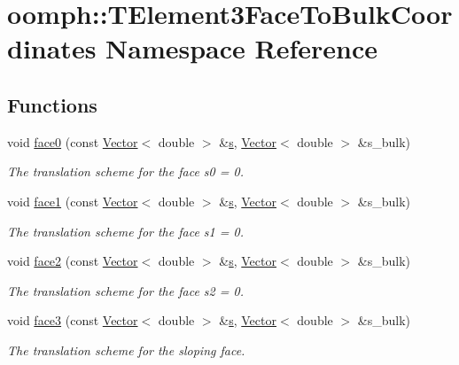 \hypertarget{namespaceoomph_1_1TElement3FaceToBulkCoordinates}{}\section{oomph\+:\+:T\+Element3\+Face\+To\+Bulk\+Coordinates Namespace Reference}
\label{namespaceoomph_1_1TElement3FaceToBulkCoordinates}
\subsection*{Functions}
\begin{DoxyCompactItemize}
\item 
void \hyperlink{namespaceoomph_1_1TElement3FaceToBulkCoordinates_a5219ed97ede607f460050f82386913d1}{face0} (const \hyperlink{classoomph_1_1Vector}{Vector}$<$ double $>$ \&\hyperlink{cfortran_8h_ab7123126e4885ef647dd9c6e3807a21c}{s}, \hyperlink{classoomph_1_1Vector}{Vector}$<$ double $>$ \&s\+\_\+bulk)
\begin{DoxyCompactList}\small\item\em The translation scheme for the face s0 = 0. \end{DoxyCompactList}\item 
void \hyperlink{namespaceoomph_1_1TElement3FaceToBulkCoordinates_a34958665c3b0f20c4ec8358ed867a6ce}{face1} (const \hyperlink{classoomph_1_1Vector}{Vector}$<$ double $>$ \&\hyperlink{cfortran_8h_ab7123126e4885ef647dd9c6e3807a21c}{s}, \hyperlink{classoomph_1_1Vector}{Vector}$<$ double $>$ \&s\+\_\+bulk)
\begin{DoxyCompactList}\small\item\em The translation scheme for the face s1 = 0. \end{DoxyCompactList}\item 
void \hyperlink{namespaceoomph_1_1TElement3FaceToBulkCoordinates_a453bcd1929cf8dca1e2601f464eda6d1}{face2} (const \hyperlink{classoomph_1_1Vector}{Vector}$<$ double $>$ \&\hyperlink{cfortran_8h_ab7123126e4885ef647dd9c6e3807a21c}{s}, \hyperlink{classoomph_1_1Vector}{Vector}$<$ double $>$ \&s\+\_\+bulk)
\begin{DoxyCompactList}\small\item\em The translation scheme for the face s2 = 0. \end{DoxyCompactList}\item 
void \hyperlink{namespaceoomph_1_1TElement3FaceToBulkCoordinates_a8f67df003a4c5d93579223d95802eb57}{face3} (const \hyperlink{classoomph_1_1Vector}{Vector}$<$ double $>$ \&\hyperlink{cfortran_8h_ab7123126e4885ef647dd9c6e3807a21c}{s}, \hyperlink{classoomph_1_1Vector}{Vector}$<$ double $>$ \&s\+\_\+bulk)
\begin{DoxyCompactList}\small\item\em The translation scheme for the sloping face. \end{DoxyCompactList}\end{DoxyCompactItemize}



